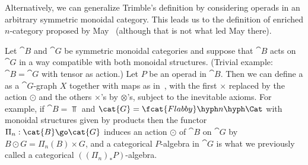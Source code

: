 %
%
%
Alternatively, we can generalize Trimble's definition by considering
operads in an arbitrary symmetric monoidal category.  This leads us to the
definition of enriched $n$-category proposed by May~\cite{MayOCA} (although
that is not what led May there).%
%
%
%
%
%
%
%
%
%

Let $\cat{B}$ and $\cat{G}$ be symmetric monoidal categories and suppose
that $\cat{B}$ acts on $\cat{G}$ in a way compatible with both monoidal
structures.  (Trivial example: $\cat{B} = \cat{G}$ with tensor as action.)
Let $P$ be an operad in $\cat{B}$.  Then we can define a
 as a $\cat{G}$-graph $X$ together with maps as
in~, with the first $\times$ replaced by the action
$\odot$ and the others $\times$'s by $\otimes$'s, subject to the inevitable
axioms.  For example, if $\cat{B} = \Top$ and $\cat{G} = \fcat{Flabby}\hyph
n\hyph\Cat$ with monoidal structures given by products then the functor
$\Pi_n: \cat{B} \go \cat{G}$ induces an action $\odot$ of $\cat{B}$ on
$\cat{G}$ by $B \odot G = \Pi_n(B) \times G$, and a categorical $P$-algebra
in $\cat{G}$ is what we previously called a categorical $((\Pi_n)_*
P)$-algebra.

